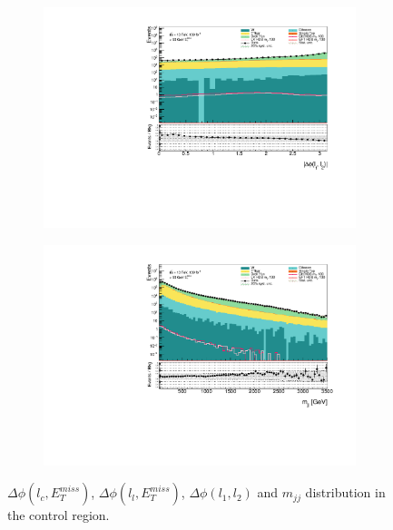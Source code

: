 \documentclass[12pt, a4paper]{book}
\begin{document}
\begin{figure}[!ht]
    \begin{subfigure}[b]{0.49\textwidth}
        \centering
        \includegraphics[width=\textwidth]{dPhiLeps.pdf}
    \end{subfigure}
    \begin{subfigure}[b]{0.49\textwidth}
        \centering
        \includegraphics[width=\textwidth]{mjj.pdf}
    \end{subfigure}
    \caption{$\Delta\phi(l_c,E_T^{miss})$, $\Delta\phi(l_l,E_T^{miss})$, $\Delta\phi(l_1,l_2)$ and $m_{jj}$ distribution in the control region.}
\end{figure}
\end{document}
